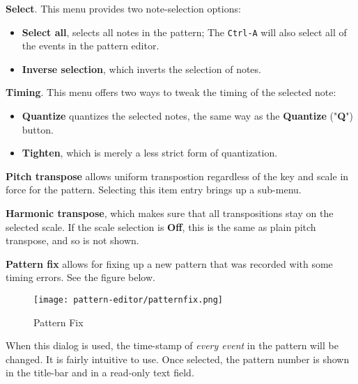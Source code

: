    \begin{enumber}
      \item \textbf{Select}.  This menu provides two note-selection options:
         \begin{itemize}
            \item \textbf{Select all}, selects all notes in the pattern;
               The  \texttt{Ctrl-A} will also select
               all of the events in the pattern editor.
            \item \textbf{Inverse selection}, which inverts the selection of
               notes.
         \end{itemize}
      \item \textbf{Timing}. This menu
            offers two ways to tweak the timing of the selected note:
         \begin{itemize}
            \item \textbf{Quantize}
               quantizes the selected notes, the same way as the
               \textbf{Quantize} ("\textbf{Q}") button.
            \item \textbf{Tighten},
               which is merely a less strict form of quantization.
         \end{itemize}
      \item \textbf{Pitch transpose} allows uniform transpostion
         regardless of the key and scale in force for the pattern.
         Selecting this item entry brings up a sub-menu.
      \item \textbf{Harmonic transpose}, which makes sure
         that all transpositions stay on the selected scale.
         If the scale selection is \textbf{Off}, this is the same as plain pitch
         transpose, and so is not shown.
      \item \textbf{Pattern fix} allows for fixing up a new pattern
         that was recorded with some timing errors.
         See the figure below.
   \end{enumber}

\begin{figure}[H]
   \centering 
  \texttt{[image: pattern-editor/patternfix.png]}
   \caption{Pattern Fix}
   \label{fig:pattern_editor_pattern_fix}
\end{figure}

   When this dialog is used, the time-stamp of \textsl{every event} in the
   pattern will be changed.
   It is fairly intuitive to use.
   Once selected, the pattern number is shown in the title-bar and in a
   read-only text field.

